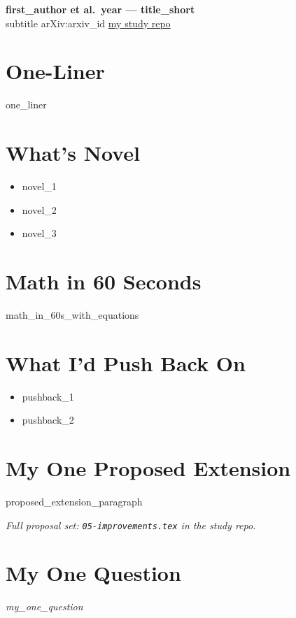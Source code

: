 \documentclass[10pt]{article}
\begin{document}
\begin{center}
  {\Large\textbf{ {{first_author}} et al.\ {{year}} --- {{title_short}} }}\\[2pt]
  {\small {{subtitle}} \quad\textbar\quad arXiv:{{arxiv_id}} \quad\textbar\quad \href{ {{github_url}} }{my study repo}}
\end{center}

\section*{One-Liner}
{{one_liner}}

\section*{What's Novel}
\begin{itemize}
  \item {{novel_1}}
  \item {{novel_2}}
  \item {{novel_3}}
\end{itemize}

\section*{Math in 60 Seconds}
{{math_in_60s_with_equations}}

\section*{What I'd Push Back On}
\begin{itemize}
  \item {{pushback_1}}
  \item {{pushback_2}}
\end{itemize}

\section*{My One Proposed Extension}
{{proposed_extension_paragraph}}

\emph{Full proposal set: \texttt{05-improvements.tex} in the study repo.}

\section*{My One Question}
\emph{ {{my_one_question}} }
\end{document}

